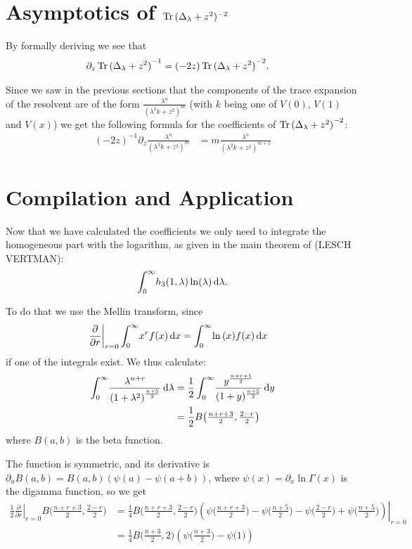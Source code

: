 \section{Asymptotics of $\Tr{(\Delta_\lambda + z^2)^{-2}}$}
By formally deriving we see that
\begin{align*}
    \partial_z \Tr{(\Delta_\lambda + z^2)}^{-1} &=
        (-2z) \Tr{(\Delta_\lambda + z^2)}^{-2}.
\end{align*}

Since we saw in the previous sections that the components of the trace expansion
of the resolvent are of the form $\frac{\lambda^n}{(\lambda^2 k + z^2)^m}$ (with
$k$ being one of $V(0)$, $V(1)$ and $V(x)$) we get the following formula for the
coefficients of $\Tr{(\Delta_\lambda + z^2)}^{-2}$:
\begin{align}
  (-2z)^{-1} \partial_z \frac{\lambda^n}{(\lambda^2 k + z^2)^{m}}
    &= m \frac{\lambda^n}{(\lambda^2 k + z^2)^{m+1}}
\end{align}

\section{Compilation and Application}
Now that we have calculated the coefficients we only need to integrate the
homogeneous part with the logarithm, as given in the main theorem of (LESCH
VERTMAN):
\begin{align*}
  \Integ[\infty]{0}{\lambda}{h_3(1,\lambda)\ln(\lambda)}.
\end{align*}

To do that we use the Mellin transform, since
\begin{align*}
    \left.\frac\partial{\partial r}\right|_{r=0}\Integ[\infty]{0}{x}{x^r f(x)}
    &= \Integ[\infty]{0}{x}{\ln{(x)} f(x)}
\end{align*}
if one of the integrals exist. We thus calculate:
\begin{align*}
    \Integ[\infty]{0}{\lambda}{\frac{\lambda^{n + r}}{\left(1 +
    \lambda^2\right)^{\frac{n+5}{2}}}} &=
    \frac12\Integ[\infty]{0}{y}{\frac{y^{\frac{n+r+1}{2}}}{(1 +
    y)^{\frac{n+5}{2}}}} \\
    &= \frac12 B\bigl(\tfrac{n+r+3}{2}, \tfrac{2-r}{2}\bigr)
\end{align*}
where $B(a,b)$ is the beta function. %

The function is symmetric, and its
derivative is $\partial_a B(a,b) = B(a,b) (\psi(a) - \psi(a+b))$, where
$\psi(x) = \partial_x \ln\Gamma(x)$ is the digamma function, so we get
\begin{align*}
    \left.\frac12\frac\partial{\partial r}\right|_{r=0} B\bigl(\tfrac{n+r+3}{2},
    \tfrac{2-r}{2}\bigr)
    &= \left.\frac14 B\bigl(\tfrac{n+r+3}{2}, \tfrac{2-r}{2}\bigr)
    \left(\psi\bigl(\tfrac{n+r+3}{2}\bigr) - \psi\bigl(\tfrac{n+5}{2}\bigr) -
    \psi\bigl(\tfrac{2-r}{2}\bigr) +
    \psi\bigl(\tfrac{n+5}{2}\bigr)\right)\right|_{r=0} \\
    &= \frac14 B\bigl(\tfrac{n+3}{2}, 2\bigr)
    \left(\psi\bigl(\tfrac{n+3}{2}\bigr) - \psi\bigl(1\bigr)\right)
\end{align*}

